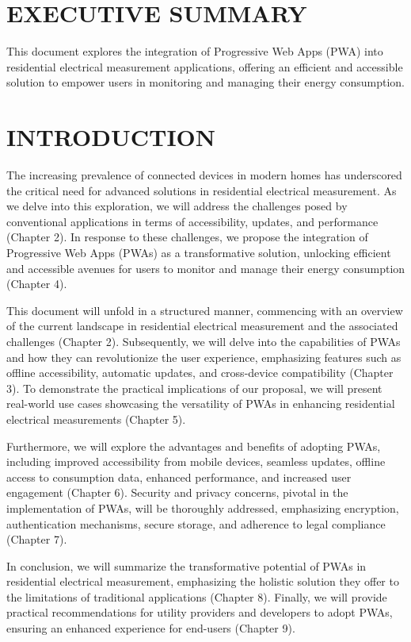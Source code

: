 \documentclass{article}
\begin{document}
\begin{multicols}{2}  %

\section*{EXECUTIVE SUMMARY}
This document explores the integration of Progressive Web Apps (PWA) into residential electrical measurement applications, offering an efficient and accessible solution to empower users in monitoring and managing their energy consumption.

\section*{INTRODUCTION}
The increasing prevalence of connected devices in modern homes has underscored the critical need for advanced solutions in residential electrical measurement. As we delve into this exploration, we will address the challenges posed by conventional applications in terms of accessibility, updates, and performance (Chapter 2). In response to these challenges, we propose the integration of Progressive Web Apps (PWAs) as a transformative solution, unlocking efficient and accessible avenues for users to monitor and manage their energy consumption (Chapter 4).

This document will unfold in a structured manner, commencing with an overview of the current landscape in residential electrical measurement and the associated challenges (Chapter 2). Subsequently, we will delve into the capabilities of PWAs and how they can revolutionize the user experience, emphasizing features such as offline accessibility, automatic updates, and cross-device compatibility (Chapter 3). To demonstrate the practical implications of our proposal, we will present real-world use cases showcasing the versatility of PWAs in enhancing residential electrical measurements (Chapter 5).

Furthermore, we will explore the advantages and benefits of adopting PWAs, including improved accessibility from mobile devices, seamless updates, offline access to consumption data, enhanced performance, and increased user engagement (Chapter 6). Security and privacy concerns, pivotal in the implementation of PWAs, will be thoroughly addressed, emphasizing encryption, authentication mechanisms, secure storage, and adherence to legal compliance (Chapter 7).

In conclusion, we will summarize the transformative potential of PWAs in residential electrical measurement, emphasizing the holistic solution they offer to the limitations of traditional applications (Chapter 8). Finally, we will provide practical recommendations for utility providers and developers to adopt PWAs, ensuring an enhanced experience for end-users (Chapter 9).


\end{multicols}
\end{document}
